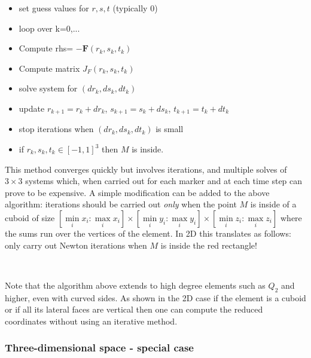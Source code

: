 \begin{itemize}
\item set guess values for $r,s,t$ (typically 0)
\item loop over k=0,...
\item Compute rhs= $-{\bm F}(r_k,s_k,t_k)$ 
\item Compute matrix $J_F(r_k,s_k,t_k)$
\item solve system for $(dr_k,ds_k,dt_k)$
\item update $r_{k+1}=r_k+dr_k$, $s_{k+1}=s_k+ds_k$, $t_{k+1}=t_k+dt_k$ 
\item stop iterations when $(dr_k,ds_k,dt_k)$ is small
\item if $r_k,s_k,t_k\in[-1,1]^3$ then $M$ is inside.
\end{itemize}
This method converges quickly but involves iterations, and multiple 
solves of $3\times 3$ systems which, when carried out for each marker 
and at each time step can prove to be expensive. 
A simple modification can be added to the above algorithm: 
iterations should be carried out {\it only}
when the point $M$ is inside of a cuboid of 
size $[\min\limits_i{x_i}:\max\limits_i{x_i}]\times[\min\limits_i{y_i}:\max\limits_i{y_i} ]
\times[\min\limits_i{z_i}:\max\limits_i{z_i}]$ where the sums run over the vertices of the element. 
In 2D this translates as follows: only carry out Newton iterations when $M$ is inside the red rectangle!
\begin{center}
\\
\end{center}

Note that the algorithm above extends to high degree elements 
such as $Q_2$ and higher, even with curved sides.
As shown in the 2D case if the element is a cuboid or 
if all its lateral faces are vertical then one can 
compute the reduced coordinates without using an iterative method.


\subsubsection{Three-dimensional space - special case}

